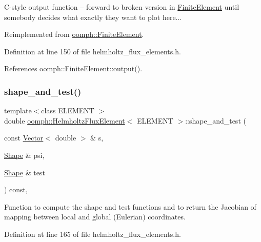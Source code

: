 C-\/style output function -- forward to broken version in \hyperlink{classoomph_1_1FiniteElement}{Finite\+Element} until somebody decides what exactly they want to plot here... 



Reimplemented from \hyperlink{classoomph_1_1FiniteElement_adfaee690bb0608f03320eeb9d110d48c}{oomph\+::\+Finite\+Element}.



Definition at line 150 of file helmholtz\+\_\+flux\+\_\+elements.\+h.



References oomph\+::\+Finite\+Element\+::output().

\mbox{\label{classoomph_1_1HelmholtzFluxElement_a7d4c36738cba6e0620fa394d66ea28c5}} 
\subsubsection{\texorpdfstring{shape\+\_\+and\+\_\+test()}{shape\_and\_test()}}
{\footnotesize\ttfamily template$<$class E\+L\+E\+M\+E\+NT $>$ \\
double \hyperlink{classoomph_1_1HelmholtzFluxElement}{oomph\+::\+Helmholtz\+Flux\+Element}$<$ E\+L\+E\+M\+E\+NT $>$\+::shape\+\_\+and\+\_\+test (\begin{DoxyParamCaption}\item[{const \hyperlink{classoomph_1_1Vector}{Vector}$<$ double $>$ \&}]{s,  }\item[{\hyperlink{classoomph_1_1Shape}{Shape} \&}]{psi,  }\item[{\hyperlink{classoomph_1_1Shape}{Shape} \&}]{test }\end{DoxyParamCaption}) const\hspace{0.3cm}{\ttfamily [inline]}, {\ttfamily [protected]}}



Function to compute the shape and test functions and to return the Jacobian of mapping between local and global (Eulerian) coordinates. 



Definition at line 165 of file helmholtz\+\_\+flux\+\_\+elements.\+h.



